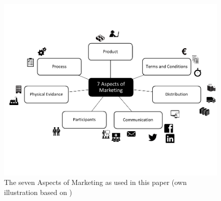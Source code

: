 \begin{figure}[H]
	\includegraphics[width=\textwidth]{img/7p.pdf}
	\caption[Seven Aspects of Marketing]{The seven Aspects of Marketing as used in this paper (own illustration based on \protect\cites[285]{Thommen.2012}[397-720]{Meffert.2015}{Hoepner2015})}
	\label{fig:aspects}
\end{figure}

